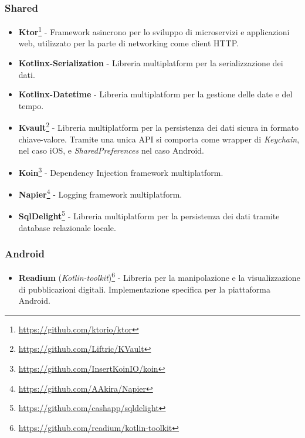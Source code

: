 \subsubsection*{Shared}
\begin{itemize} 
    \item \textbf{Ktor}\footnote{\href{https://github.com/ktorio/ktor}{https://github.com/ktorio/ktor}} - Framework asincrono per lo sviluppo di microservizi e applicazioni web, utilizzato per la parte di networking come client HTTP.
    \item \textbf{Kotlinx-Serialization} - Libreria multiplatform per la serializzazione dei dati.
    \item \textbf{Kotlinx-Datetime} - Libreria multiplatform per la gestione delle date e del tempo.
    \item \textbf{Kvault}\footnote{\href{https://github.com/Liftric/KVault}{https://github.com/Liftric/KVault}} - Libreria multiplatform per la persistenza dei dati sicura in formato chiave-valore. Tramite una unica API si comporta come wrapper di \textit{Keychain}, nel caso iOS, e \textit{SharedPreferences} nel caso Android.
    \item \textbf{Koin}\footnote{\href{https://github.com/InsertKoinIO/koin}{https://github.com/InsertKoinIO/koin}} - Dependency Injection framework multiplatform.
    \item \textbf{Napier}\footnote{\href{https://github.com/AAkira/Napier}{https://github.com/AAkira/Napier}} - Logging framework multiplatform.
    \item \textbf{SqlDelight}\footnote{\href{https://github.com/cashapp/sqldelight}{https://github.com/cashapp/sqldelight}} - Libreria multiplatform per la persistenza dei dati tramite database relazionale locale.
\end{itemize}

\subsubsection*{Android}
\begin{itemize}
    \item \textbf{Readium} (\textit{Kotlin-toolkit})\footnote{\href{https://github.com/readium/kotlin-toolkit}{https://github.com/readium/kotlin-toolkit}} - Libreria per la manipolazione e la visualizzazione di pubblicazioni digitali. Implementazione specifica per la piattaforma Android. 
\end{itemize}


